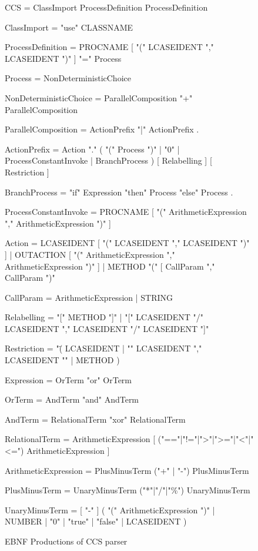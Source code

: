 	\begin{figure}
\begin{code}
CCS = { ClassImport } ProcessDefinition { ProcessDefinition } 

ClassImport = "use" CLASSNAME 

ProcessDefinition = 
  PROCNAME [ "(" LCASEIDENT {"," LCASEIDENT } ")" ] "=" Process 

Process = NonDeterministicChoice

NonDeterministicChoice = ParallelComposition { "+" ParallelComposition }

ParallelComposition = ActionPrefix { "|" ActionPrefix } .

ActionPrefix =
  { Action "." }
  (
    "(" Process ")"
    | "0"
    | ProcessConstantInvoke
    | BranchProcess
  )
  [ Relabelling ]
  [ Restriction ]

BranchProcess = "if" Expression "then" Process "else" Process .

ProcessConstantInvoke = 
  PROCNAME [ "(" ArithmeticExpression {"," ArithmeticExpression } ")" ]

Action =
  LCASEIDENT [ "(" LCASEIDENT { "," LCASEIDENT } ")" ]
  | OUTACTION [ "(" ArithmeticExpression { "," ArithmeticExpression } ")" ]
  | METHOD "(" [ CallParam { "," CallParam } ")"

CallParam = ArithmeticExpression | STRING

Relabelling =
  "[" METHOD "]"
  | "[" LCASEIDENT "/" LCASEIDENT { "," LCASEIDENT "/" LCASEIDENT } "]"

Restriction = 
  "\" 
  (
    LCASEIDENT 
    | "{" LCASEIDENT {"," LCASEIDENT } "}"
    | METHOD
  )        

Expression = OrTerm { "or" OrTerm }

OrTerm = AndTerm { "and" AndTerm }

AndTerm = RelationalTerm { "xor" RelationalTerm }

RelationalTerm = 
  ArithmeticExpression [ ("=="|"!="|">"|">="|"<"|"<=") ArithmeticExpression ]
		
ArithmeticExpression = PlusMinusTerm { ("+" | "-") PlusMinusTerm }

PlusMinusTerm = UnaryMinusTerm { ("*"|"/"|"\%") UnaryMinusTerm }

UnaryMinusTerm =
  [ "-" ]                                   
  (
    "(" ArithmeticExpression ")"
    | NUMBER 
    | "0"
    | "true"
    | "false"
    | LCASEIDENT
  )
	\end{code}
	\caption{EBNF Productions of CCS parser}\label{fig:ccs_ebnf}
	\end{figure}
	
